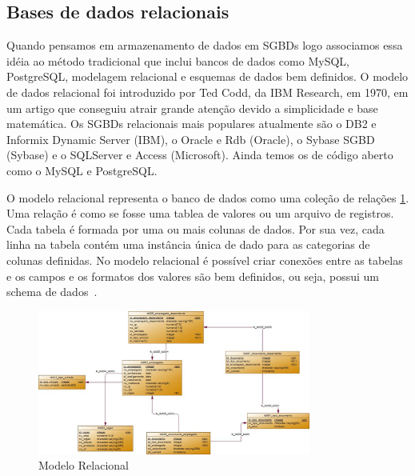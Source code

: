 \subsection{Bases de dados relacionais}

Quando pensamos em armazenamento de dados em SGBDs logo associamos essa idéia ao método tradicional que inclui bancos de dados como MySQL, PostgreSQL, modelagem relacional e esquemas de dados bem definidos. O modelo de dados relacional foi introduzido por Ted Codd, da IBM Research, em 1970, em um artigo que conseguiu atrair grande atenção devido a simplicidade e base matemática. Os SGBDs relacionais mais populares atualmente são o DB2 e Informix Dynamic Server (IBM), o Oracle e Rdb (Oracle), o Sybase SGBD (Sybase) e o SQLServer e Access (Microsoft). Ainda temos os de código aberto como o MySQL e PostgreSQL.

O modelo relacional representa o banco de dados como uma coleção de relações \ref{fig:modelorelacional}. Uma relação é como se fosse uma tablea de valores ou um arquivo de registros. Cada tabela é formada por uma ou mais colunas de dados. Por sua vez, cada linha na tabela contém uma instância única de dado para as categorias de colunas definidas. No modelo relacional é possível criar conexões entre as tabelas e os  campos e os formatos dos valores são bem definidos, ou seja, possui um schema de dados~\cite{SBElmasri,nosqlliveup}.

	\begin{figure}[!htbp]
		\begin{center}
			\includegraphics[width=0.8\textwidth]{modelo_relacional}
		\end{center}
		\caption{Modelo Relacional }
		\label{fig:modelorelacional}
	\end{figure}

